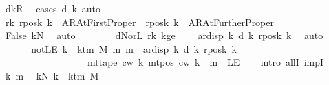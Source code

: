 \begin{isabellebody}
\ dkR\ \isamarkupfalse%
\ {\isacharparenleft}{\kern0pt}cases\ {\isachardoublequoteopen}d\ k{\isachardoublequoteclose}{\isacharparenright}{\kern0pt}\ auto\isanewline
\ \ \ \ \ \ \isamarkupfalse%
\ rk{\isacharcolon}{\kern0pt}\ {\isachardoublequoteopen}{\isacharquery}{\kern0pt}rposk\ k\ {\isacharequal}{\kern0pt}\ AR{\isacharunderscore}{\kern0pt}AtFirstProper\ {\isasymor}\ {\isacharquery}{\kern0pt}rposk\ k\ {\isacharequal}{\kern0pt}\ AR{\isacharunderscore}{\kern0pt}AtFurtherProper{\isachardoublequoteclose}\isanewline
\ \ \ \ \ \ \ \ \isamarkupfalse%
\ False\ kN\ \isamarkupfalse%
\ auto\isanewline
\ \ \ \ \ \ \isamarkupfalse%
\ dN{\isacharunderscore}{\kern0pt}or{\isacharunderscore}{\kern0pt}L\ rk\ kge{}\ \isamarkupfalse%
\ {\isachardoublequoteopen}{}\ {\isacharless}{\kern0pt}\ ar{\isacharunderscore}{\kern0pt}disp\ {\isacharquery}{\kern0pt}k\ {\isacharparenleft}{\kern0pt}d\ k{\isacharparenright}{\kern0pt}\ {\isacharparenleft}{\kern0pt}{\isacharquery}{\kern0pt}rposk\ k{\isacharparenright}{\kern0pt}{\isachardoublequoteclose}\ \isamarkupfalse%
\ auto\isanewline
\ \ \ \ \isamarkupfalse%
\isanewline
\ \ \isamarkupfalse%
\isanewline
\ \ \isamarkupfalse%
\ notLE{\isacharcolon}{\kern0pt}\ {\isachardoublequoteopen}{\isasymforall}k\ {\isacharless}{\kern0pt}\ k{\isacharunderscore}{\kern0pt}tm\ M{\isachardot}{\kern0pt}\ {\isasymforall}m{\isachardot}{\kern0pt}\ m\ {\isacharless}{\kern0pt}\ ar{\isacharunderscore}{\kern0pt}disp\ {\isacharquery}{\kern0pt}k\ {\isacharparenleft}{\kern0pt}d\ k{\isacharparenright}{\kern0pt}\ {\isacharparenleft}{\kern0pt}{\isacharquery}{\kern0pt}rposk\ k{\isacharparenright}{\kern0pt}\isanewline
\ \ \ \ \ \ \ \ \ \ \ \ \ \ \ \ \ {\isasymlongrightarrow}\ mt{\isacharunderscore}{\kern0pt}tape\ c{\isacharunderscore}{\kern0pt}w\ k\ {\isacharparenleft}{\kern0pt}mt{\isacharunderscore}{\kern0pt}pos\ c{\isacharunderscore}{\kern0pt}w\ k\ {\isacharminus}{\kern0pt}\ m{\isacharparenright}{\kern0pt}\ {\isasymnoteq}\ LE{}{\isachardoublequoteclose}\isanewline
\ \ \isamarkupfalse%
\ {\isacharparenleft}{\kern0pt}intro\ allI\ impI{\isacharparenright}{\kern0pt}\isanewline
\ \ \ \ \isamarkupfalse%
\ k\ m\ \isamarkupfalse%
\ kN{\isacharcolon}{\kern0pt}\ {\isachardoublequoteopen}k\ {\isacharless}{\kern0pt}\ k{\isacharunderscore}{\kern0pt}tm\ M{\isachardoublequoteclose}\isanewline

\end{isabellebody}
